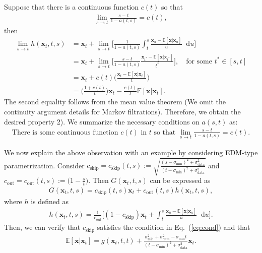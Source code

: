 \documentclass{article} \usepackage{iclr2024_coNFErence,times}
\def\eqref#1{equation~\ref{#1}}
\def\eqref#1{(\ref{#1})}
\def\eqref#1{(\ref{#1})}
\theoremstyle{definition}
\theoremstyle{remark}
\newcommand*\diff{\mathop{}\!\mathrm{d}}
\begin{document}
Suppose that there is a continuous function $c(t)$ so that 
\begin{align*}
    \lim_{s\rightarrow t} \frac{s-t}{1-a(t,s)} = c(t),
\end{align*}
then 
\begin{align*}
    \lim_{s\rightarrow t }h(\mathbf{x}_t, t, s) &= \mathbf{x}_t +  \lim_{s\rightarrow t } \Big[ \frac{1}{1-a(t,s)} \int_{t}^{s}\frac{\mathbf{x}_{u}-\mathbb{E}[\mathbf{x}\vert\mathbf{x}_{u}]}{u}\diff u \Big] 
    \\ &= \mathbf{x}_t + \lim_{s\rightarrow t } \Big[ \frac{s-t}{1-a(t,s)} \frac{\mathbf{x}_{t^*}-\mathbb{E}[\mathbf{x}\vert\mathbf{x}_{t^*}]}{t^*} \Big],\quad \text{for some } t^*\in[s, t]
    \\ & = \mathbf{x}_t + c(t) \Big( \frac{\mathbf{x}_t -\mathbb{E}[\mathbf{x}\vert\mathbf{x}_{t}] }{t} \Big)
    \\ & = \Big(\frac{1+c(t)}{t} \Big)\mathbf{x}_t - \frac{c(t)}{t} \mathbb{E}[\mathbf{x}\vert\mathbf{x}_{t}].
\end{align*}
The second equality follows from the mean value theorem (We omit the continuity argument details for Markov filtrations). Therefore, we obtain the desired property 2). We summarize the necessary conditions on $a(s,t)$ as:
\begin{align}\label{eq:cond}
    \text{There is some continuous function } c(t) \text{ in } t \text{ so that } \lim_{s\rightarrow t} \frac{s-t}{1-a(t,s)} = c(t).
\end{align}


We now explain the above observation with an example by considering EDM-type parametrization. Consider $c_{\text{skip}}=c_{\text{skip}}(t,s):=\sqrt{\frac{(s-\sigma_{\text{min}})^{2}+\sigma_{\text{data}}^{2}}{(t-\sigma_{\text{min}})^{2}+\sigma_{\text{data}}^{2}}}$ and $c_{\text{out}}=c_{\text{out}}(t,s):=\Big(1-\frac{s}{t}\Big)$. Then $G(\mathbf{x}_{t},t,s)$ can be expressed as 
\begin{align*}
    G(\mathbf{x}_{t},t,s)=c_{\text{skip}}(t,s)\mathbf{x}_{t}+c_{\text{out}}(t,s)h(\mathbf{x}_{t},t,s),
\end{align*}
where $h$ is defined as 
\begin{align*}
    h(\mathbf{x}_t, t,s ) = \frac{1}{c_{\text{out}}}\Big[(1-c_{\text{skip}})\mathbf{x}_t + \int_{t}^{s}\frac{\mathbf{x}_{u}-\mathbb{E}[\mathbf{x}\vert\mathbf{x}_{u}]}{u}\diff u  \Big].
\end{align*}
Then, we can verify that $c_{\text{skip}}$ satisfies the condition in Eq.~\eqref{eq:cond} and that
\begin{align*}
    \mathbb{E}[\mathbf{x}\vert\mathbf{x}_{t}]=g(\mathbf{x}_{t},t,t)+\frac{\sigma_{\text{min}}^{2}+\sigma_{\text{data}}^{2}-\sigma_{\text{min}}t}{(t-\sigma_{\text{min}})^{2}+\sigma_{\text{data}}^{2}}\mathbf{x}_{t}.
\end{align*}
\end{document}
